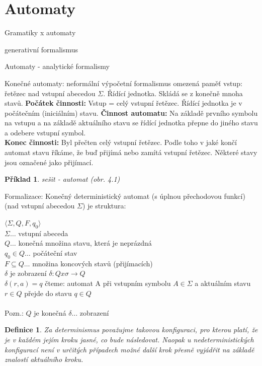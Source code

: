 \documentclass[10pt, a4paper, titlepage]{article}
\theoremstyle{note}
\newtheorem{definice}{\textbf{Definice}}
\newtheorem{priklad}{\textbf{Příklad}}
\begin{document}
\section{Automaty}
Gramatiky x automaty

generativní formalismus

Automaty - analytické formalismy

Konečné automaty: neformální
výpočetní formalismus 
omezená paměť
vstup: řetězec nad vstupní abecedou $\Sigma.$ Řídící jednotka. Skládá se z konečně mnoha stavů.
\textbf{Počátek činnosti:} Vstup = celý vstupní řetězec. Řídící jednotka je v počátečním (iniciálním) stavu.
\textbf{Činnost automatu:} Na základě prvního symbolu na vstupu a na základě aktuálního stavu se řídící jednotka 
přepne do jiného stavu a odebere vstupní symbol.\\
\textbf{Konec činnosti:} Byl přečten celý vstupní řetězec. Podle toho v jaké končí automat stavu říkáme, 
že buď přijímá nebo zamítá vstupní řetězec. Některé stavy jsou označené jako přijímací.

\begin{priklad}
sešit - automat (obr. 4.1)
\end{priklad}

Formalizace:
Konečný deterministický automat (s úplnou přechodovou funkcí) (nad vstupní abecedou $\Sigma$) je struktura:

$\langle \Sigma, Q, F, q_{0} \rangle$ \\
$\Sigma \ldots$ vstupní abeceda \\
$Q \ldots$ konečná množina stavu, která je neprázdná \\
$q_{0} \in Q \ldots$ počáteční stav \\
$F \subseteq Q \ldots$ množina koncových stavů (přijímacích) \\
$\delta$ je zobrazení $\delta: Q x \sigma \rightarrow Q$ \\
$\delta(r,a) = q$ čteme: automat A při vstupním symbolu $A \in \Sigma$ a aktuálním stavu $r \in Q$
 přejde do stavu $q \in Q$
\\ \\
Pozn.: $Q$ je konečná
$\delta \ldots$ zobrazení



\begin{definice}
Za \emph{determinismus} považujme takovou konfiguraci, pro kterou platí, že je v každém jejím kroku jasné, co bude následovat.
Naopak u \emph{nedeterministických} konfigurací není v určitých případech možné další krok přesně vyjádřit na základě znalostí aktuálního kroku.
\end{definice}
\end{document}
